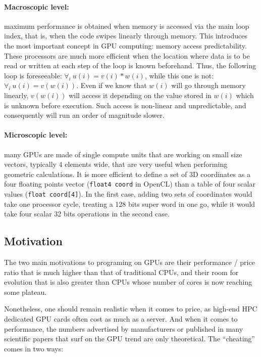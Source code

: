 \documentclass[a4paper,12pt]{article}
\begin{document}
\paragraph{Macroscopic level:} maximum performance is obtained when memory is accessed via the main loop index, that is, when the code swipes linearly through memory. This introduces the most important concept in GPU computing: memory access predictability. These processors are much more efficient when the location where data is to be read or written at each step of the loop is known beforehand. Thus, the following loop is foreseeable: $\forall_{i} ~u(i)=v(i)*w(i)$, while this one is not:$\forall_{i} ~u(i)=v(w(i))$. Even if we know that $w(i)$ will go through memory linearly, $v(w(i))$ will access it depending on the value stored in $w(i)$ which is unknown before execution. Such access is non-linear and unpredictable, and consequently will run an order of magnitude slower.

\paragraph{Microscopic level:} many GPUs are made of single compute units that are working on small size vectors, typically 4 elements wide, that are very useful when performing geometric calculations. It is more efficient to define a set of 3D coordinates as a four floating points vector ({\tt float4 coord} in OpenCL) than a table of four scalar values ({\tt float coord[4]}). In the first case, adding two sets of coordinates would take one processor cycle, treating a 128 bits super word in one go, while it would take four scalar 32 bits operations in the second case.


\subsection{Motivation}
The two main motivations to programing on GPUs are their performance / price ratio that is much higher than that of traditional CPUs, and their room for evolution that is also greater than CPUs whose number of cores is now reaching some plateau.

Nonetheless, one should remain realistic when it comes to price, as high-end HPC dedicated GPU cards often cost as much as a server. And when it comes to performance, the numbers advertised by manufacturers or published in many scientific papers that surf on the GPU trend are only theoretical.
The ``cheating'' comes in two ways:
\end{document}
